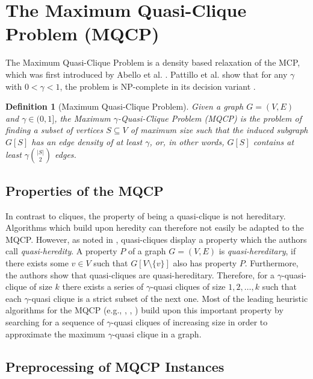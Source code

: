 \documentclass[draft,final]{vutinfth} %
\newtheorem{definition}{Definition}[section]
\begin{document}
\section{The Maximum Quasi-Clique Problem (MQCP)}\label{sec:mqcp}

The Maximum Quasi-Clique Problem is a density based relaxation of the MCP, which was first introduced by Abello et al. \cite{Abello2002}. Pattillo et al. show that for any $\gamma$ with $0 < \gamma < 1$, the problem is NP-complete in its decision variant \cite{pattillo_maximum_2013}. 

\begin{definition}[Maximum Quasi-Clique Problem]
	\label{def:mqcp}
	Given a graph $G = (V,E)$ and $\gamma \in (0,1]$, the Maximum $\gamma$-Quasi-Clique Problem (MQCP) is the problem of finding a subset of vertices $S \subseteq V$ of maximum size 
	such that the induced subgraph $G[S]$ has an edge density of at least $\gamma$, or, in other words, $G[S]$ contains at least $\gamma \binom{|S|}{2}$ edges. 
\end{definition}

\subsection{Properties of the MQCP}
In contrast to cliques, the property of being a quasi-clique is not hereditary. Algorithms which build upon heredity can therefore not easily be adapted to the MQCP. However, as noted in \cite{pattillo_maximum_2013}, quasi-cliques display a property which the authors call \textit{quasi-heredity}. A property $P$ of a graph $G = (V, E)$ is \textit{quasi-hereditary}, if there exists some $v \in V$ such that $G[V \setminus \{v\}]$ also has property $P$. Furthermore, the authors show that quasi-cliques are quasi-hereditary. Therefore, for a $\gamma$-quasi-clique of size $k$ there exists a series of $\gamma$-quasi cliques of size $1,2, \dots, k$ such that each $\gamma$-quasi clique is a strict subset of the next one. Most of the leading heuristic algorithms for the MQCP (e.g., \cite{djeddi_extension_2019}, \cite{zhou_opposition-based_2020}, \cite{chen_nuqclq_2021}) build upon this important property by searching for a sequence of $\gamma$-quasi cliques of increasing size in order to approximate the maximum $\gamma$-quasi clique in a graph. 

\subsection{Preprocessing of MQCP Instances}
\end{document}
